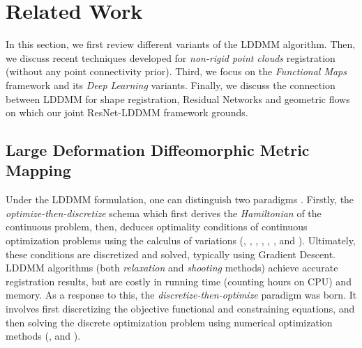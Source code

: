 
\section{Related Work}
\label{Sec:RelatedWork}

In this section, we first review different variants of the LDDMM algorithm. Then, we discuss recent techniques developed for \textit{non-rigid point clouds} registration (without any point connectivity prior). Third, we focus on the \textit{Functional Maps} framework and its \textit{Deep Learning} variants. Finally, we discuss the connection between LDDMM for shape registration, Residual Networks and geometric flows on which our joint ResNet-LDDMM framework grounds.

\subsection{Large Deformation Diffeomorphic Metric Mapping}
\label{sec:LDDMM}

Under the LDDMM formulation, one can distinguish two paradigms \cite{polzin2020discretize}. Firstly, the \textit{optimize-then-discretize} schema which first derives the \textit{Hamiltonian} of the continuous problem, then, deduces optimality conditions of continuous optimization problems using the calculus of variations (\eg \cite{arguillere2016multipleshapes}, \cite{arguillere2016diffeomorphic} \cite{younes2009evolutions}, \cite{gris2018sub}, \cite{vialard2012diffeomorphic}, \cite{charon2013varifold}, \cite{miller2015hamiltonian}, and \cite{miller2020coarse}). Ultimately, these conditions are discretized and solved, typically using Gradient Descent. LDDMM algorithms (both \textit{relaxation} and \textit{shooting} methods) achieve accurate registration results, but are costly in running time (counting hours on CPU) and memory. As a response to this, the \textit{discretize-then-optimize} paradigm was born. It involves first discretizing the objective functional and constraining equations, and then solving the discrete optimization problem using numerical optimization methods (\eg \cite{modersitzki2009fair}, \cite{mang2017lagrangian} and \cite{polzin2020discretize}).%

